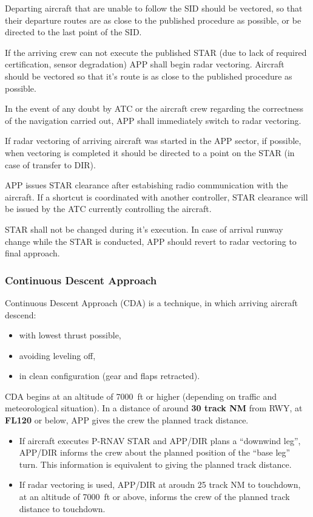 Departing aircraft that are unable to follow the SID should be vectored, so that
their departure routes are as close to the published procedure as possible, or
be directed to the last point of the SID.

If the arriving crew can not execute the published STAR (due to lack of required
certification, sensor degradation) APP shall begin radar vectoring. Aircraft
should be vectored so that it's route is as close to the published procedure as
possible.

In the event of any doubt by ATC or the aircraft crew regarding the correctness
of the navigation carried out, APP shall immediately switch to radar vectoring.

If radar vectoring of arriving aircraft was started in the APP sector, if
possible, when vectoring is completed it should be directed to a point on the
STAR (in case of transfer to DIR).

APP issues STAR clearance after estabishing radio communication with the
aircraft. If a shortcut is coordinated with another controller, STAR clearance
will be issued by the ATC currently controlling the aircraft.

STAR shall not be changed during it's execution. In case of arrival runway
change while the STAR is conducted, APP should revert to radar vectoring to
final approach.

\subsubsection{Continuous Descent Approach}

Continuous Descent Approach (CDA) is a technique, in which arriving aircraft
descend:

\begin{itemize}
\item with lowest thrust possible,
\item avoiding leveling off,
\item in clean configuration (gear and flaps retracted).
\end{itemize}

CDA begins at an altitude of 7000~ft or higher (depending on traffic and
meteorological situation). In a distance of around \textbf{30 track NM} from
RWY, at \textbf{FL120} or below, APP gives the crew the planned track distance.

\begin{itemize}
\item If aircraft executes P-RNAV STAR and APP/DIR plans a ``downwind leg'',
APP/DIR informs the crew about the planned position of the ``base leg'' turn.
This information is equivalent to giving the planned track distance.
\item If radar vectoring is used, APP/DIR at aroudn 25 track NM to touchdown, at
an altitude of 7000~ft or above, informs the crew of the planned track distance
to touchdown.
\end{itemize}


